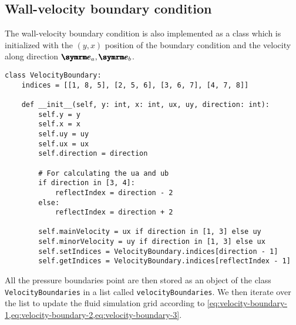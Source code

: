\subsection{Wall-velocity boundary condition}

The wall-velocity boundary condition is also implemented as a class which is initialized with the $(y, x)$ position of the boundary condition and the velocity along direction $\vv{e}_a, \vv{e}_b$.
\begin{verbatim}
class VelocityBoundary:
    indices = [[1, 8, 5], [2, 5, 6], [3, 6, 7], [4, 7, 8]]

    def __init__(self, y: int, x: int, ux, uy, direction: int):
        self.y = y
        self.x = x
        self.uy = uy
        self.ux = ux
        self.direction = direction

        # For calculating the ua and ub
        if direction in [3, 4]:
            reflectIndex = direction - 2
        else:
            reflectIndex = direction + 2

        self.mainVelocity = ux if direction in [1, 3] else uy
        self.minorVelocity = uy if direction in [1, 3] else ux
        self.setIndices = VelocityBoundary.indices[direction - 1]
        self.getIndices = VelocityBoundary.indices[reflectIndex - 1]
\end{verbatim}
All the pressure boundaries point are then stored as an object of the class \texttt{VelocityBoundaries} in a list called \texttt{velocityBoundaries}. We then iterate over the list to update the fluid simulation grid according to \cref{eq:velocity-boundary-1,eq:velocity-boundary-2,eq:velocity-boundary-3}.
